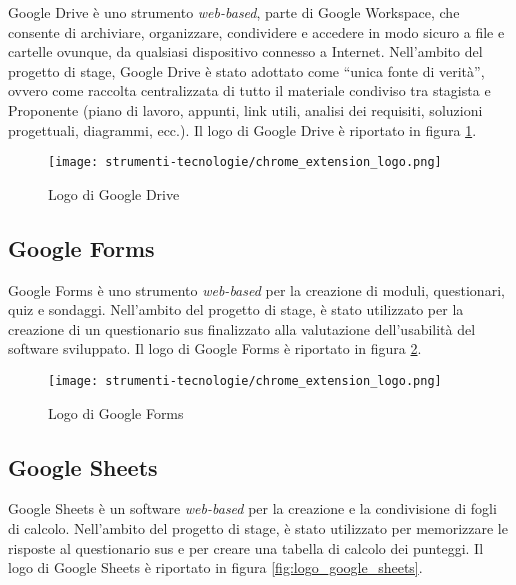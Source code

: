 \par Google Drive è uno strumento \textit{web-based}, parte di Google Workspace, che consente di archiviare, organizzare, condividere e accedere in modo sicuro a file e cartelle ovunque, da qualsiasi dispositivo connesso a Internet. Nell’ambito del progetto di stage, Google Drive è stato adottato come “unica fonte di verità”, ovvero come raccolta centralizzata di tutto il materiale condiviso tra stagista e Proponente (piano di lavoro, appunti, link utili, analisi dei \gls{requisiti}, soluzioni progettuali, diagrammi, ecc.). Il logo di Google Drive è riportato in figura \ref{fig:logo_google_drive}.

\begin{figure}[H]
  \centering 
  \texttt{[image: strumenti-tecnologie/chrome\_extension\_logo.png]} 
  \caption{Logo di Google Drive}
  \label{fig:logo_google_drive}
\end{figure}

\subsection*{Google Forms}

\par Google Forms è uno strumento \textit{web-based} per la creazione di moduli, questionari, quiz e sondaggi. Nell’ambito del progetto di stage, è stato utilizzato per la creazione di un questionario \gls{sus} finalizzato alla valutazione dell’usabilità del software sviluppato. Il logo di Google Forms è riportato in figura \ref{fig:logo_google_forms}.

\begin{figure}[H]
  \centering 
  \texttt{[image: strumenti-tecnologie/chrome\_extension\_logo.png]} 
  \caption{Logo di Google Forms}
  \label{fig:logo_google_forms}
\end{figure}

\subsection*{Google Sheets}

\par Google Sheets è un software \textit{web-based} per la creazione e la condivisione di fogli di calcolo. Nell’ambito del progetto di stage, è stato utilizzato per memorizzare le risposte al questionario \gls{sus} e per creare una tabella di calcolo dei punteggi. Il logo di Google Sheets è riportato in figura \ref{fig:logo_google_sheets}.

